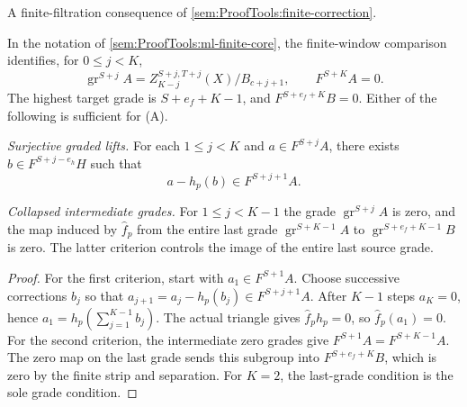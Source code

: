 \begin{lemma}
\label{sem:ProofTools:ml-ambiguity-criteria}
A finite-filtration consequence of \ref{sem:ProofTools:finite-correction}.\par
In the notation of \ref{sem:ProofTools:ml-finite-core}, the finite-window
comparison identifies, for $0\leq j<K$,
\[
 \operatorname{gr}^{S+j}A
 =Z_{K-j}^{S+j,T+j}(X)/B_{c+j+1},\qquad F^{S+K}A=0.
\]
The highest target grade is $S+e_f+K-1$, and
$F^{S+e_f+K}B=0$.
Either of the following is sufficient for (A).

\emph{Surjective graded lifts.} For each $1\leq j<K$ and
$a\in F^{S+j}A$, there exists
$b\in F^{S+j-e_h}H$ such that
\[
 a-h_p(b)\in F^{S+j+1}A.
\]

\emph{Collapsed intermediate grades.} For $1\leq j<K-1$ the grade
$\operatorname{gr}^{S+j}A$ is zero, and the map induced by $\widehat f_p$
from the entire last grade $\operatorname{gr}^{S+K-1}A$ to
$\operatorname{gr}^{S+e_f+K-1}B$ is zero.
The latter criterion controls the image of the entire last source grade.
\end{lemma}
\begin{proof}
For the first criterion, start with $a_1\in F^{S+1}A$. Choose successive
corrections $b_j$ so that $a_{j+1}=a_j-h_p(b_j)\in F^{S+j+1}A$.
After $K-1$ steps $a_K=0$, hence
$a_1=h_p(\sum_{j=1}^{K-1}b_j)$. The actual triangle gives
$\widehat f_ph_p=0$, so $\widehat f_p(a_1)=0$.
For the second criterion, the intermediate zero grades give
$F^{S+1}A=F^{S+K-1}A$. The zero map on the last grade sends this subgroup
into $F^{S+e_f+K}B$, which is zero by the finite strip and separation.
For $K=2$, the last-grade condition is the sole grade condition.
\end{proof}

